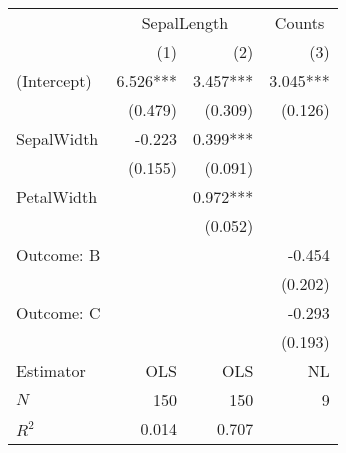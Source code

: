 \begin{tabular}{lrrr}
\toprule
            & \multicolumn{2}{c}{SepalLength} & \multicolumn{1}{c}{Counts} \\ 
\cmidrule(lr){2-3} \cmidrule(lr){4-4} 
            &      (1) &                  (2) &                        (3) \\ 
\midrule
(Intercept) & 6.526*** &             3.457*** &                   3.045*** \\ 
            &  (0.479) &              (0.309) &                    (0.126) \\ 
SepalWidth  &   -0.223 &             0.399*** &                            \\ 
            &  (0.155) &              (0.091) &                            \\ 
PetalWidth  &          &             0.972*** &                            \\ 
            &          &              (0.052) &                            \\ 
Outcome: B  &          &                      &                     -0.454 \\ 
            &          &                      &                    (0.202) \\ 
Outcome: C  &          &                      &                     -0.293 \\ 
            &          &                      &                    (0.193) \\ 
\midrule
Estimator   &      OLS &                  OLS &                         NL \\ 
\midrule
$N$         &      150 &                  150 &                          9 \\ 
$R^2$       &    0.014 &                0.707 &                            \\ 
\bottomrule
\end{tabular}

